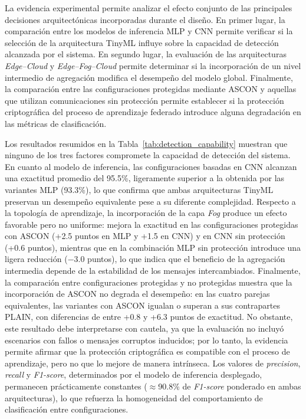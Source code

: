 \documentclass[journal,article,submit,moreauthors]{Definitions/mdpi}
\begin{document}
La evidencia experimental permite analizar el efecto conjunto de las principales decisiones arquitectónicas incorporadas durante el diseño. En primer lugar, la comparación entre los modelos de inferencia MLP y CNN permite verificar si la selección de la arquitectura TinyML influye sobre la capacidad de detección alcanzada por el sistema. En segundo lugar, la evaluación de las arquitecturas \textit{Edge--Cloud} y \textit{Edge--Fog--Cloud} permite determinar si la incorporación de un nivel intermedio de agregación modifica el desempeño del modelo global. Finalmente, la comparación entre las configuraciones protegidas mediante ASCON y aquellas que utilizan comunicaciones sin protección permite establecer si la protección criptográfica del proceso de aprendizaje federado introduce alguna degradación en las métricas de clasificación.

Los resultados resumidos en la Tabla~\ref{tab:detection_capability} muestran que ninguno de los tres factores compromete la capacidad de detección del sistema. En cuanto al modelo de inferencia, las configuraciones basadas en CNN alcanzan una exactitud promedio del 95.5\%, ligeramente superior a la obtenida por las variantes MLP (93.3\%), lo que confirma que ambas arquitecturas TinyML preservan un desempeño equivalente pese a su diferente complejidad. Respecto a la topología de aprendizaje, la incorporación de la capa \textit{Fog} produce un efecto favorable pero no uniforme: mejora la exactitud en las configuraciones protegidas con ASCON (+2.5 puntos en MLP y +1.5 en CNN) y en CNN sin protección (+0.6 puntos), mientras que en la combinación MLP sin protección introduce una ligera reducción (\(-3.0\) puntos), lo que indica que el beneficio de la agregación intermedia depende de la estabilidad de los mensajes intercambiados. Finalmente, la comparación entre configuraciones protegidas y no protegidas muestra que la incorporación de ASCON no degrada el desempeño: en las cuatro parejas equivalentes, las variantes con ASCON igualan o superan a sus contrapartes PLAIN, con diferencias de entre +0.8 y +6.3 puntos de exactitud. No obstante, este resultado debe interpretarse con cautela, ya que la evaluación no incluyó escenarios con fallos o mensajes corruptos inducidos; por lo tanto, la evidencia permite afirmar que la protección criptográfica es compatible con el proceso de aprendizaje, pero no que lo mejore de manera intrínseca. Los valores de \textit{precision}, \textit{recall} y \textit{F1-score}, determinados por el modelo de inferencia desplegado, permanecen prácticamente constantes (\(\approx\)90.8\% de \textit{F1-score} ponderado en ambas arquitecturas), lo que refuerza la homogeneidad del comportamiento de clasificación entre configuraciones.
\end{document}
